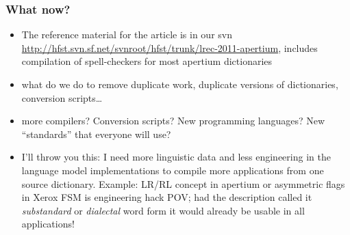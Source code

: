 \documentclass{beamer}
\begin{document}
\begin{frame}
    \frametitle{What now?}
    \begin{itemize}
        \item The reference material for the article is in our svn
            \url{http://hfst.svn.sf.net/svnroot/hfst/trunk/lrec-2011-apertium},
            includes compilation of spell-checkers for most apertium
            dictionaries
        \item what do we do to remove duplicate work, duplicate versions of
            dictionaries, conversion scripts\ldots
        \item more compilers? Conversion scripts? New programming languages?
            New ``standards'' that everyone will use?
        \item I'll throw you this: I need more linguistic data and less
            engineering in the language model implementations to compile
            more applications from one source dictionary. Example: LR/RL concept
            in apertium or asymmetric flags in Xerox FSM is engineering hack 
            POV; had the description
            called it \emph{substandard} or \emph{dialectal} word form it would
            already be usable in all applications!
    \end{itemize}
\end{frame}
\end{document}
